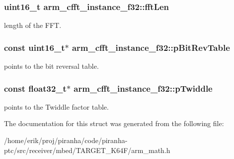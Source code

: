 \subsubsection[{\texorpdfstring{fft\+Len}{fftLen}}]{\setlength{\rightskip}{0pt plus 5cm}uint16\+\_\+t arm\+\_\+cfft\+\_\+instance\+\_\+f32\+::fft\+Len}\hypertarget{structarm__cfft__instance__f32_acd8f9e9540e3dd348212726e5d6aaa95}{}\label{structarm__cfft__instance__f32_acd8f9e9540e3dd348212726e5d6aaa95}
length of the F\+FT. 
\subsubsection[{\texorpdfstring{p\+Bit\+Rev\+Table}{pBitRevTable}}]{\setlength{\rightskip}{0pt plus 5cm}const uint16\+\_\+t$\ast$ arm\+\_\+cfft\+\_\+instance\+\_\+f32\+::p\+Bit\+Rev\+Table}\hypertarget{structarm__cfft__instance__f32_a21ceaf59a1bb8440af57c28d2dd9bbab}{}\label{structarm__cfft__instance__f32_a21ceaf59a1bb8440af57c28d2dd9bbab}
points to the bit reversal table. 
\subsubsection[{\texorpdfstring{p\+Twiddle}{pTwiddle}}]{\setlength{\rightskip}{0pt plus 5cm}const float32\+\_\+t$\ast$ arm\+\_\+cfft\+\_\+instance\+\_\+f32\+::p\+Twiddle}\hypertarget{structarm__cfft__instance__f32_a59cc6f753f1498716e1444ac054c06de}{}\label{structarm__cfft__instance__f32_a59cc6f753f1498716e1444ac054c06de}
points to the Twiddle factor table. 

The documentation for this struct was generated from the following file\+:\begin{DoxyCompactItemize}
\item 
/home/erik/proj/piranha/code/piranha-\/ptc/src/receiver/mbed/\+T\+A\+R\+G\+E\+T\+\_\+\+K64\+F/arm\+\_\+math.\+h\end{DoxyCompactItemize}
